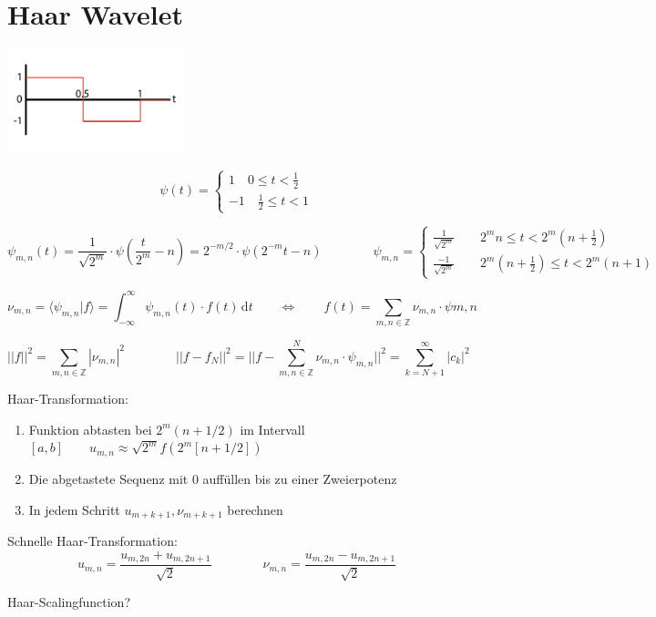 \section{Haar Wavelet}

\begin{center}
	\begin{minipage}[c]{0.3\textwidth}
		\includegraphics[height=3cm]{content/HaarWavelet.pdf}
	\end{minipage}	
	\begin{minipage}[c]{0.3\textwidth}
		\[
			\psi(t)=\begin{cases} 1 \quad 0 \leq t < \frac{1}{2}\\ -1 \quad \frac{1}{2} \leq t < 1  \end{cases}  
		\]
	\end{minipage}
\end{center}


\[  
	\psi_{m,n}(t)=\frac{1}{\sqrt{2^m}} \cdot \psi(\frac{t}{2^m} - n) = 2^{-m/2} \cdot \psi(2^{-m}t-n) 
	\qquad \qquad
	\psi_{m,n}  = \begin{cases} 
	\frac{1}{\sqrt{2^m}} \qquad 2^m n \leq t < 2^m(n+\frac{1}{2}) \\ 
	\frac{-1}{\sqrt{2^m}} \qquad 2^m(n+\frac{1}{2}) \leq t < 2^m(n+1)
	\end{cases}
\]

\[ 
	\nu_{m,n} = \langle \psi_{m,n} | f \rangle = \int_{-\infty}^{\infty}\psi_{m,n}(t) \cdot f(t) \,\mathrm{d}t
	\qquad \Longleftrightarrow \qquad
	f(t)=\sum_{m,n \in \mathbb{Z}} \nu_{m,n} \cdot \psi{m,n}
\]
	
\[  
	||f||^2 = \sum_{m,n \in \mathbb{Z}} |\nu_{m,n}|^2 \qquad \qquad ||f-f_N||^2 = ||f - \sum_{m,n \in \mathbb{Z}}^N \nu_{m,n} \cdot \psi_{m,n}||^2 = \sum_{k=N+1}^{\infty} |c_k|^2
\]

Haar-Transformation:
\begin{enumerate}
	\item Funktion abtasten bei $2^m(n+1/2)$ im Intervall $[a,b] \qquad u_{m,n}\approx \sqrt{2^m}f(2^m[n+1/2])$ 
	\item Die abgetastete Sequenz mit 0 auffüllen bis zu einer Zweierpotenz
	\item In jedem Schritt $u_{m+k+1}, \nu_{m+k+1}$ berechnen
\end{enumerate}

Schnelle Haar-Transformation:
\[  
	u_{m,n} = \dfrac{u_{m,2n}+u_{m,2n+1}}{\sqrt{2}} 
	\qquad \qquad
	\nu_{m,n} = \dfrac{u_{m,2n}-u_{m,2n+1}}{\sqrt{2}}
\]

Haar-Scalingfunction?